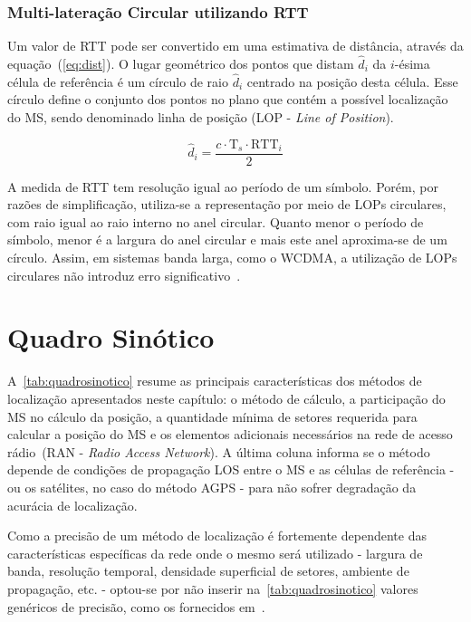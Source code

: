 \subsubsection{Multi-lateração Circular utilizando RTT}
Um valor de RTT pode ser convertido em uma estimativa de distância, através da equação~(\ref{eq:dist}). O lugar geométrico dos pontos que distam $\hat{d}_{i}$ da $i$-ésima célula de referência é um círculo de raio $\hat{d}_{i}$ centrado na posição desta célula. Esse círculo define o conjunto dos pontos no plano que contém a possível localização do MS, sendo denominado linha de posição (LOP - \textit{Line of Position}).

\begin{equation}
\label{eq:dist}
\hat{d}_{i}= \frac{c \cdot \textrm{T}_{s} \cdot \textrm{RTT}_{i}}{2}
\end{equation}

A medida de RTT tem resolução igual ao período de um símbolo. Porém, por razões de simplificação, utiliza-se a representação por meio de LOPs circulares, com raio igual ao raio interno no anel circular. Quanto menor o período de símbolo, menor é a largura do anel circular e mais este anel aproxima-se de um círculo. Assim, em sistemas banda larga, como o WCDMA, a utilização de LOPs circulares não introduz erro significativo~\cite{CidRttForcedHandover}.

\section{\textbf{Quadro Sinótico}}
\label{sec:Cap1Quadro}

A~\ref{tab:quadrosinotico} resume as principais características dos métodos de localização apresentados neste capítulo: o método de cálculo, a participação do MS no cálculo da posição, a quantidade mínima de setores requerida para calcular a posição do MS e os elementos adicionais necessários na rede de acesso rádio~(RAN - \textit{Radio Access Network}). A última coluna informa se o método depende de condições de propagação LOS entre o MS e as células de referência - ou os satélites, no caso do método AGPS - para não sofrer degradação da acurácia de localização.

Como a precisão de um método de localização é fortemente dependente das características específicas da rede onde o mesmo será utilizado - largura de banda, resolução temporal, densidade superficial de setores, ambiente de propagação, etc. - optou-se por não inserir na~\ref{tab:quadrosinotico} valores genéricos de precisão, como os fornecidos em~\cite{WlanLocationMethodsSurvey}.

